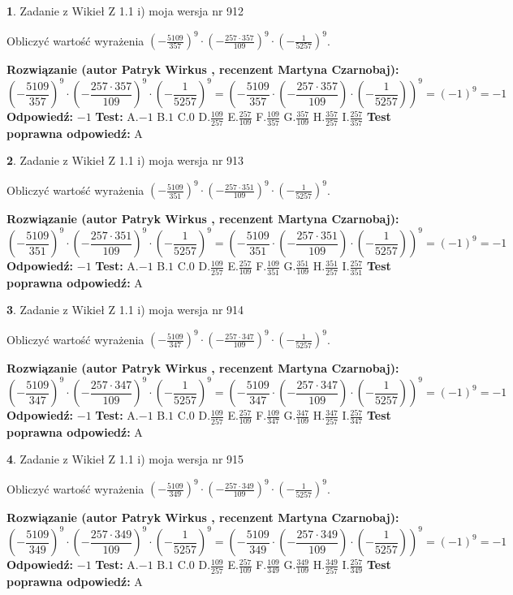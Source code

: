 \documentclass[12pt, a4paper]{article}
\theoremstyle{definition} %
\newtheorem{zad}{}
\newcommand{\zadStart}[1]{\begin{zad}#1\newline}
\newcommand{\zadStop}{\end{zad}}
\newcommand{\rozwStart}[2]{\noindent \textbf{Rozwiązanie (autor #1 , recenzent #2): }\newline}
\newcommand{\rozwStop}{\newline}
\newcommand{\odpStart}{\noindent \textbf{Odpowiedź:}\newline}
\newcommand{\odpStop}{\newline}
\newcommand{\testStart}{\noindent \textbf{Test:}\newline}
\newcommand{\testStop}{\newline}
\newcommand{\kluczStart}{\noindent \textbf{Test poprawna odpowiedź:}\newline}
\newcommand{\kluczStop}{\newline}
\begin{document}
\zadStart{Zadanie z Wikieł Z 1.1 i) moja wersja nr 912}

Obliczyć wartość wyrażenia $(-\frac{5109}{357})^{9} \cdot (-\frac{257 \cdot 357}{109})^{9} \cdot (-\frac{1}{5257})^{9}$.
\zadStop
\rozwStart{Patryk Wirkus}{Martyna Czarnobaj}
$$(-\frac{5109}{357})^{9} \cdot (-\frac{257 \cdot 357}{109})^{9} \cdot (-\frac{1}{5257})^{9} = (-\frac{5109}{357} \cdot (-\frac{257 \cdot 357}{109}) \cdot (-\frac{1}{5257}))^{9} = (-1)^{9} = -1$$
\rozwStop
\odpStart
$-1$
\odpStop
\testStart
A.$-1$ B.$1$ C.$0$ D.$\frac{109}{257}$ E.$\frac{257}{109}$
F.$\frac{109}{357}$ G.$\frac{357}{109}$
H.$\frac{357}{257}$
I.$\frac{257}{357}$
\testStop
\kluczStart
A
\kluczStop



\zadStart{Zadanie z Wikieł Z 1.1 i) moja wersja nr 913}

Obliczyć wartość wyrażenia $(-\frac{5109}{351})^{9} \cdot (-\frac{257 \cdot 351}{109})^{9} \cdot (-\frac{1}{5257})^{9}$.
\zadStop
\rozwStart{Patryk Wirkus}{Martyna Czarnobaj}
$$(-\frac{5109}{351})^{9} \cdot (-\frac{257 \cdot 351}{109})^{9} \cdot (-\frac{1}{5257})^{9} = (-\frac{5109}{351} \cdot (-\frac{257 \cdot 351}{109}) \cdot (-\frac{1}{5257}))^{9} = (-1)^{9} = -1$$
\rozwStop
\odpStart
$-1$
\odpStop
\testStart
A.$-1$ B.$1$ C.$0$ D.$\frac{109}{257}$ E.$\frac{257}{109}$
F.$\frac{109}{351}$ G.$\frac{351}{109}$
H.$\frac{351}{257}$
I.$\frac{257}{351}$
\testStop
\kluczStart
A
\kluczStop



\zadStart{Zadanie z Wikieł Z 1.1 i) moja wersja nr 914}

Obliczyć wartość wyrażenia $(-\frac{5109}{347})^{9} \cdot (-\frac{257 \cdot 347}{109})^{9} \cdot (-\frac{1}{5257})^{9}$.
\zadStop
\rozwStart{Patryk Wirkus}{Martyna Czarnobaj}
$$(-\frac{5109}{347})^{9} \cdot (-\frac{257 \cdot 347}{109})^{9} \cdot (-\frac{1}{5257})^{9} = (-\frac{5109}{347} \cdot (-\frac{257 \cdot 347}{109}) \cdot (-\frac{1}{5257}))^{9} = (-1)^{9} = -1$$
\rozwStop
\odpStart
$-1$
\odpStop
\testStart
A.$-1$ B.$1$ C.$0$ D.$\frac{109}{257}$ E.$\frac{257}{109}$
F.$\frac{109}{347}$ G.$\frac{347}{109}$
H.$\frac{347}{257}$
I.$\frac{257}{347}$
\testStop
\kluczStart
A
\kluczStop



\zadStart{Zadanie z Wikieł Z 1.1 i) moja wersja nr 915}

Obliczyć wartość wyrażenia $(-\frac{5109}{349})^{9} \cdot (-\frac{257 \cdot 349}{109})^{9} \cdot (-\frac{1}{5257})^{9}$.
\zadStop
\rozwStart{Patryk Wirkus}{Martyna Czarnobaj}
$$(-\frac{5109}{349})^{9} \cdot (-\frac{257 \cdot 349}{109})^{9} \cdot (-\frac{1}{5257})^{9} = (-\frac{5109}{349} \cdot (-\frac{257 \cdot 349}{109}) \cdot (-\frac{1}{5257}))^{9} = (-1)^{9} = -1$$
\rozwStop
\odpStart
$-1$
\odpStop
\testStart
A.$-1$ B.$1$ C.$0$ D.$\frac{109}{257}$ E.$\frac{257}{109}$
F.$\frac{109}{349}$ G.$\frac{349}{109}$
H.$\frac{349}{257}$
I.$\frac{257}{349}$
\testStop
\kluczStart
A
\kluczStop
\end{document}
